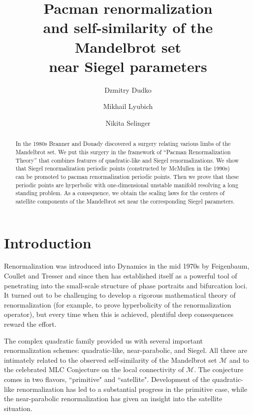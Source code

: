 \documentclass[]{amsart}
\newcommand\MM{\mathcal{M}}
\theoremstyle{remark}
\numberwithin{equation}{section}
\theoremstyle{definition}
\begin{document}
\title[Pacmen]{Pacman renormalization\\and self-similarity of the Mandelbrot set \\near Siegel parameters}
\author{Dzmitry Dudko}
\author{Mikhail Lyubich}
\author{Nikita Selinger}

\begin{abstract}
 In the 1980s Branner and Douady discovered a surgery relating various limbs of the Mandelbrot set. We put this surgery in the framework of ``Pacman Renormalization Theory'' that combines features of quadratic-like and Siegel renormalizations. We show that Siegel renormalization
periodic points (constructed by McMullen in the 1990s) can be promoted to pacman renormalization periodic points. Then we prove that these periodic points are hyperbolic with one-dimensional unstable manifold resolving a long standing problem. As a consequence, we obtain the scaling laws for the centers of satellite components of the Mandelbrot set near the corresponding Siegel parameters.
\end{abstract}
\maketitle


\setcounter{tocdepth}{1}


\tableofcontents

\section{Introduction}

Renormalization was introduced into Dynamics in the mid 1970s by Feigenbaum,
Coullet and Tresser and since then has established itself as  a powerful tool of penetrating into the small-scale structure of  phase portraits and bifurcation loci.
It turned out to be challenging to develop a rigorous mathematical theory of renormalization (for example, to prove hyperbolicity of the renormalization operator),
but every time when this is achieved, plentiful  deep consequences  reward the effort.

The complex quadratic family provided us with several important renormalization schemes: quadratic-like,  near-parabolic, and Siegel. 
All three are intimately related to the 
observed self-similarity of the Mandelbrot set $\MM$  and to the 
celebrated MLC Conjecture on the local connectivity of $\MM$. 
The conjecture comes in two flavors, ``primitive" and ``satellite".  Development of the quadratic-like renormalization has led to a substantial progress in the primitive case, while the near-parabolic renormalization has given an insight into the satellite situation. 
\end{document}
